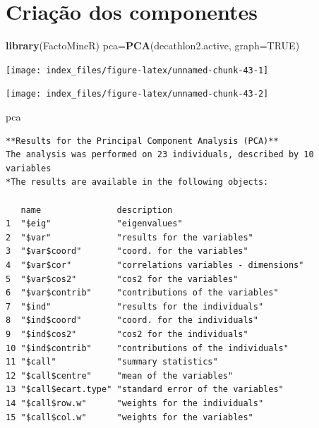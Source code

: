 \documentclass[12pt,brazil,oneside]{book}
\newenvironment{Shaded}{\begin{snugshade}}{\end{snugshade}}
\newcommand{\DataTypeTok}[1]{\textcolor[rgb]{0.13,0.29,0.53}{#1}}
\newcommand{\KeywordTok}[1]{\textcolor[rgb]{0.13,0.29,0.53}{\textbf{#1}}}
\newcommand{\NormalTok}[1]{#1}
\newcommand{\OtherTok}[1]{\textcolor[rgb]{0.56,0.35,0.01}{#1}}
\begin{document}
\hypertarget{criacao-dos-componentes}{%
\section{Criação dos componentes}\label{criacao-dos-componentes}}

\begin{Shaded}
\begin{Highlighting}[]
\KeywordTok{library}\NormalTok{(FactoMineR)}
\NormalTok{pca=}\KeywordTok{PCA}\NormalTok{(decathlon2.active, }\DataTypeTok{graph=}\OtherTok{TRUE}\NormalTok{)}
\end{Highlighting}
\end{Shaded}

\begin{center}\texttt{[image: index\_files/figure-latex/unnamed-chunk-43-1]} \end{center}

\begin{center}\texttt{[image: index\_files/figure-latex/unnamed-chunk-43-2]} \end{center}

\begin{Shaded}
\begin{Highlighting}[]
\NormalTok{pca}
\end{Highlighting}
\end{Shaded}

\begin{verbatim}
**Results for the Principal Component Analysis (PCA)**
The analysis was performed on 23 individuals, described by 10 variables
*The results are available in the following objects:

   name               description                          
1  "$eig"             "eigenvalues"                        
2  "$var"             "results for the variables"          
3  "$var$coord"       "coord. for the variables"           
4  "$var$cor"         "correlations variables - dimensions"
5  "$var$cos2"        "cos2 for the variables"             
6  "$var$contrib"     "contributions of the variables"     
7  "$ind"             "results for the individuals"        
8  "$ind$coord"       "coord. for the individuals"         
9  "$ind$cos2"        "cos2 for the individuals"           
10 "$ind$contrib"     "contributions of the individuals"   
11 "$call"            "summary statistics"                 
12 "$call$centre"     "mean of the variables"              
13 "$call$ecart.type" "standard error of the variables"    
14 "$call$row.w"      "weights for the individuals"        
15 "$call$col.w"      "weights for the variables"          
\end{verbatim}
\end{document}

